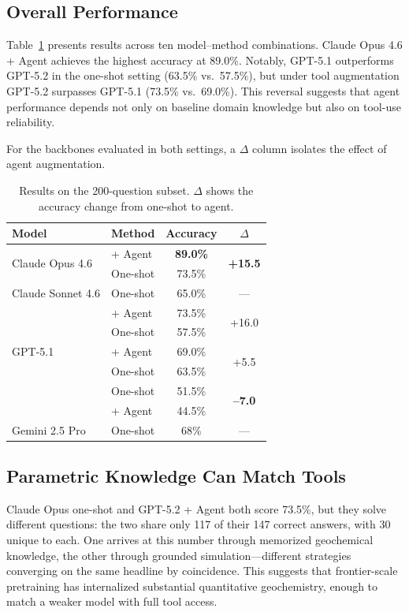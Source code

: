 \documentclass[sigconf,anonymous]{acmart}
\begin{document}
\subsection{Overall Performance}
Table~\ref{tab:main_results} presents results across
ten model--method combinations. Claude Opus 4.6 +
Agent achieves the highest accuracy at 89.0\%.
Notably, GPT-5.1 outperforms GPT-5.2 in the one-shot setting (63.5\% vs.\ 57.5\%), 
but under tool augmentation GPT-5.2 surpasses GPT-5.1 (73.5\% vs.\ 69.0\%). 
This reversal suggests that agent performance depends not only on baseline domain knowledge but also on tool-use reliability.

For the backbones evaluated in both settings,
a $\Delta$ column isolates the effect of agent
augmentation.

\begin{table}[h]
\centering
\normalsize
\renewcommand{\arraystretch}{1.2}
\begin{tabular}{llcc}
\toprule
Model & Method & Accuracy & $\Delta$ \\
\midrule
\multirow{2}{*}{Claude Opus 4.6}
  & + Agent        & \textbf{89.0\%} & \multirow{2}{*}{\textbf{+15.5}} \\
  & One-shot       & 73.5\% & \\
\addlinespace
Claude Sonnet 4.6
  & One-shot       & 65.0\% & --- \\
\addlinespace
\multirow{2}{*}{GPT-5.2}
  & + Agent        & 73.5\% & \multirow{2}{*}{+16.0} \\
  & One-shot       & 57.5\% & \\
\addlinespace
GPT-5.1
  & + Agent        & 69.0\% & \multirow{2}{*}{+5.5} \\
  & One-shot       & 63.5\% & \\
\addlinespace
\multirow{2}{*}{Gemini 2.5 Flash}
  & One-shot       & 51.5\% & \multirow{2}{*}{\textbf{--7.0}} \\
  & + Agent        & 44.5\% & \\
\addlinespace
Gemini 2.5 Pro
  & One-shot       & 68\% & --- \\
\bottomrule
\end{tabular}
\caption{Results on the 200-question subset.
$\Delta$ shows the accuracy change from one-shot
to agent.}
\label{tab:main_results}
\end{table}

\subsection{Parametric Knowledge Can Match Tools}
Claude Opus one-shot and GPT-5.2 + Agent both
score 73.5\%, but they solve different questions:
the two share only 117 of their 147 correct answers,
with 30 unique to each. One arrives at this number
through memorized geochemical knowledge, the other
through grounded simulation---different strategies
converging on the same headline by coincidence.
This suggests that frontier-scale pretraining has
internalized substantial quantitative geochemistry,
enough to match a weaker model with full tool access.
\end{document}
